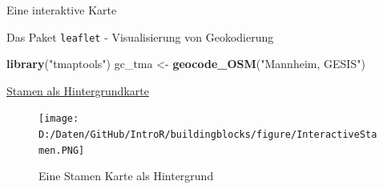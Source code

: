 \documentclass[ignorenonframetext,]{beamer}
\newenvironment{Shaded}{\begin{snugshade}}{\end{snugshade}}
\newcommand{\KeywordTok}[1]{\textcolor[rgb]{0.26,0.66,0.93}{\textbf{#1}}}
\newcommand{\DataTypeTok}[1]{\textcolor[rgb]{0.74,0.68,0.62}{\underline{#1}}}
\newcommand{\FloatTok}[1]{\textcolor[rgb]{0.27,0.67,0.26}{#1}}
\newcommand{\StringTok}[1]{\textcolor[rgb]{0.02,0.61,0.04}{#1}}
\newcommand{\OperatorTok}[1]{\textcolor[rgb]{0.74,0.68,0.62}{#1}}
\newcommand{\NormalTok}[1]{\textcolor[rgb]{0.74,0.68,0.62}{#1}}
\begin{document}
\begin{frame}[fragile]{Eine interaktive Karte}

\begin{Shaded}
\end{Shaded}

\end{frame}

\begin{frame}[fragile]{Das Paket \texttt{leaflet} - Visualisierung von
Geokodierung}

\begin{Shaded}
\begin{Highlighting}[]
\KeywordTok{library}\NormalTok{(}\StringTok{"tmaptools"}\NormalTok{)}
\NormalTok{gc_tma <-}\StringTok{ }\KeywordTok{geocode_OSM}\NormalTok{(}\StringTok{"Mannheim, GESIS"}\NormalTok{)}
\end{Highlighting}
\end{Shaded}

\begin{Shaded}
\end{Shaded}

\end{frame}

\begin{frame}[fragile]{\href{https://rstudio.github.io/leaflet/basemaps.html}{Stamen
als Hintergrundkarte}}

\begin{Shaded}
\end{Shaded}

\begin{figure}
\centering
\texttt{[image: D:/Daten/GitHub/IntroR/buildingblocks/figure/InteractiveStamen.PNG]}
\caption{Eine Stamen Karte als Hintergrund}
\end{figure}

\end{frame}
\end{document}
